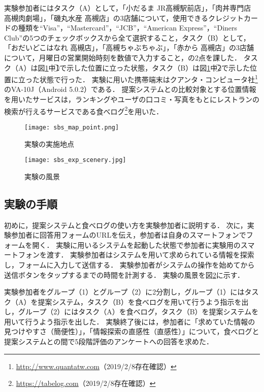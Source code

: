     実験参加者にはタスク（A）として，「小だるま JR高槻駅前店」，「肉丼専門店 高槻肉劇場」，「磯丸水産 高槻店」の3店舗について，使用できるクレジットカードの種類を``Visa''，``Mastercard''，``JCB''，``American Express''，``Diners Club''の5つのチェックボックスから全て選択すること，タスク（B）として，「おだいどこはなれ 高槻店」，「高槻ちゃぶちゃぶ」，「赤から 高槻店」の3店舗について，月曜日の営業開始時刻を数値で入力すること，の2点を課した．
    タスク（A）は図\ref{figure:exp_sbs_point}中\textcircled{\scriptsize 1}で示した位置に立った状態，タスク（B）は図\ref{figure:exp_sbs_point}中\textcircled{\scriptsize 2}で示した位置に立った状態で行った．
    実験に用いた携帯端末はクアンタ・コンピュータ社\footnote{\url{http://www.quantatw.com}（2019/2/8存在確認）}のVA-10J（Android 5.0.2）である．
    提案システムとの比較対象とする位置情報を用いたサービスは，ランキングやユーザの口コミ・写真をもとにレストランの検索が行えるサービスである食べログ\footnote{\url{https://tabelog.com}（2019/2/8存在確認）}を用いた．

  \begin{figure}[tb]
    \begin{center}
      \texttt{[image: sbs\_map\_point.png]}
      \caption{実験の実施地点}
      \label{figure:exp_sbs_point}
    \end{center}
  \end{figure}

  \begin{figure}[tb]
    \centerline{\texttt{[image: sbs\_exp\_scenery.jpg]}}
    \caption{実験の風景}
    \label{figure:exp_sbs_scenery}
  \end{figure}

  \subsection{実験の手順}
    初めに，提案システムと食べログの使い方を実験参加者に説明する．
    次に，実験参加者に回答用フォームのURLを伝え，参加者は自身のスマートフォンでフォームを開く．
    実験に用いるシステムを起動した状態で参加者に実験用のスマートフォンを渡す．
    実験参加者はシステムを用いて求められている情報を探索し，フォームに入力して送信する．
    実験参加者がシステムの操作を始めてから送信ボタンをタップするまでの時間を計測する．
    実験の風景を図\ref{figure:exp_sbs_scenery}に示す．

    実験参加者をグループ（1）とグループ（2）に2分割し，グループ（1）にはタスク（A）を提案システム，タスク（B）を食べログを用いて行うよう指示を出し，グループ（2）にはタスク（A）を食べログ，タスク（B）を提案システムを用いて行うよう指示を出した．
    実験終了後には，参加者に「求めていた情報の見つけやすさ（簡便性）」，「情報探索の直感性（直感性）」について，食べログと提案システムとの間で5段階評価のアンケートへの回答を求めた．

